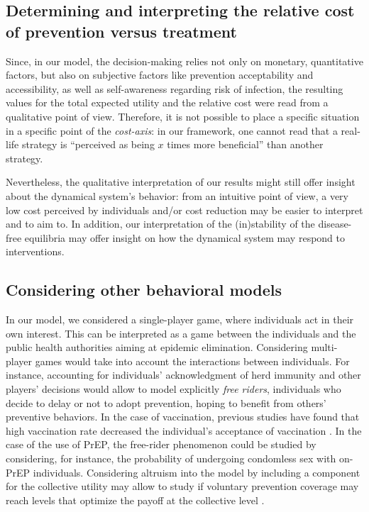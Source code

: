 
\subsection{Determining and interpreting the relative cost of prevention versus treatment}
Since, in our model, the decision-making relies not only on monetary, quantitative factors, but also on subjective factors like prevention acceptability and accessibility, as well as self-awareness regarding risk of infection, the resulting values for the total expected utility and the relative cost were read from a qualitative point of view. 
%
Therefore, it is not possible to place a specific situation in a specific point of the {\it cost-axis}: in our framework, one cannot read that a real-life strategy is ``perceived as being $x$ times more beneficial'' than another strategy. 

Nevertheless, the qualitative interpretation of our results might still offer insight about the dynamical system's behavior: from an intuitive point of view, a very low cost perceived by individuals and/or cost reduction may be easier to interpret and to aim to. In addition, our interpretation of the (in)stability of the disease-free equilibria may offer insight on how the dynamical system may respond to interventions. 


\subsection{Considering other behavioral models}
In our model, we considered a single-player game, where individuals act in their own interest. This can be interpreted as a game between the individuals and the public health authorities aiming at epidemic elimination. Considering multi-player games would take into account the interactions between individuals. For instance, accounting for individuals' acknowledgment of herd immunity and other players' decisions would allow to model explicitly \textit{free riders}, individuals who decide to delay or not to adopt prevention, hoping to benefit from others' preventive behaviors. In the case of vaccination, previous studies have found that high vaccination rate decreased the individual's acceptance of vaccination \cite[]{Ibuka2014}. In the case of the use of PrEP, the free-rider phenomenon could be studied by considering, for instance, the probability of undergoing condomless sex with on-PrEP individuals. Considering altruism into the model by including a component for the collective utility may allow to study if voluntary prevention coverage may reach levels that optimize the payoff at the collective level \cite[]{Shim2012}. 



